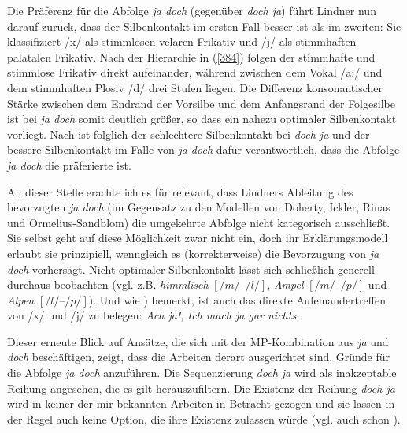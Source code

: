 Die Präferenz für die Abfolge \textit{ja doch} (gegenüber \textit{doch ja}) führt Lindner nun darauf zurück, dass der Silbenkontakt im ersten Fall besser ist als im zweiten: Sie klassifiziert /x/ als stimmlosen velaren Frikativ und /j/ als stimmhaften palatalen Frikativ. Nach der Hierarchie in (\ref{384}) folgen der stimmhafte und stimmlose Frikativ direkt aufeinander, während zwischen dem Vokal /a:/ und dem stimmhaften Plosiv /d/ drei Stufen liegen. Die Differenz konsonantischer Stärke zwischen dem Endrand der Vorsilbe und dem Anfangsrand der Folgesilbe ist bei \textit{ja doch} somit deutlich größer, so dass ein nahezu optimaler Silbenkontakt vorliegt. Nach \citet{Lindner1991} ist folglich der schlechtere Silbenkontakt bei \textit{doch ja} und der bessere Silbenkontakt im Falle von \textit{ja doch} dafür verantwortlich, dass die Abfolge \textit{ja doch} die präferierte ist.

An dieser Stelle erachte ich es für relevant, dass Lindners Ableitung des bevor\-zugten \textit{ja doch} (im Gegensatz zu den Modellen von Doherty, Ickler, Rinas und Ormelius-Sandblom) die umgekehr\-te Abfolge nicht kategorisch ausschließt. Sie selbst geht auf diese Möglichkeit zwar nicht ein, doch ihr Erklärungsmodell erlaubt sie prinzi\-piell, wenngleich es (korrekterweise) die Bevorzugung von \textit{ja doch} vorhersagt. Nicht-optimaler Silbenkontakt lässt sich schließlich generell \\ durchaus beobachten (vgl. z.B. \textit{himmlisch} $[/m/–/l/]$, \textit{Ampel} $[/m/–/p/]$ und \textit{Alpen} $[/l/–/p/]$). Und wie \citet[430]{Rinas2007}) bemerkt, ist auch das direkte Aufein\-andertreffen von /x/ und /j/ zu belegen: \textit{Ach ja!}, \textit{Ich mach ja gar nichts.}

Dieser erneute Blick auf Ansätze, die sich mit der MP-Kombination aus \textit{ja} und \textit{doch} beschäftigen, zeigt, dass die Arbeiten derart ausgerichtet sind, Gründe für die Abfolge \textit{ja doch} anzuführen. Die Sequenzierung \textit{doch ja} wird als inakzeptable Reihung angesehen, die es gilt herauszufiltern. Die Existenz der Reihung \textit{doch ja} wird in keiner der mir bekannten Arbeiten in Betracht gezogen und sie lassen in der Regel auch keine Option, die ihre E\-xistenz zulassen würde (vgl. auch schon \citealt[170-175]{Mueller2014a}).

